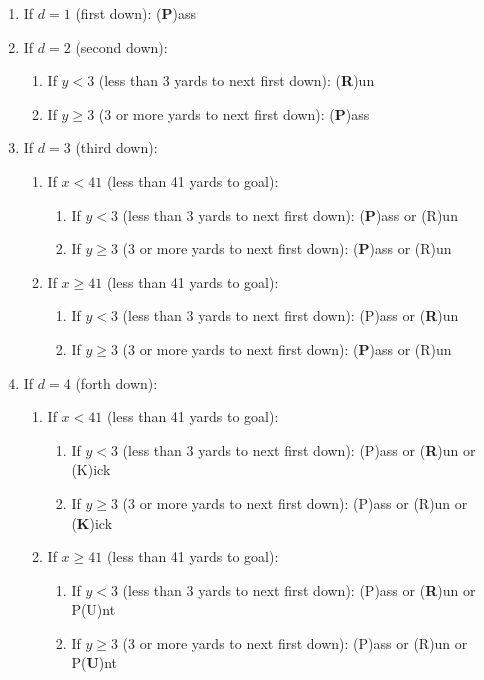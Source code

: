 \documentclass[11pt, oneside]{article}   	%
\begin{document}
\begin{enumerate}
\item If $d=1$ (first down): (\textbf{P})ass

\item If $d=2$ (second down): 
\begin{enumerate}
\item If $y<3$ (less than 3 yards to next first down): (\textbf{R})un
\item If $y\geq3$ (3 or more yards to next first down): (\textbf{P})ass
\end{enumerate}

\item If $d=3$ (third down): 
\begin{enumerate}
\item If $x<41$ (less than 41 yards to goal):
\begin{enumerate}
\item If $y<3$ (less than 3 yards to next first down): (\textbf{P})ass or (R)un
\item If $y\geq3$ (3 or more yards to next first down): (\textbf{P})ass or (R)un
\end{enumerate}
\item If $x \geq 41$ (less than 41 yards to goal):
\begin{enumerate}
\item If $y<3$ (less than 3 yards to next first down): (P)ass or (\textbf{R})un
\item If $y\geq3$ (3 or more yards to next first down): (\textbf{P})ass or (R)un
\end{enumerate}
\end{enumerate}

\item If $d=4$ (forth down): 
\begin{enumerate}
\item If $x<41$ (less than 41 yards to goal):
\begin{enumerate}
\item If $y<3$ (less than 3 yards to next first down): (P)ass or (\textbf{R})un or (K)ick
\item If $y\geq3$ (3 or more yards to next first down): (P)ass or (R)un or (\textbf{K})ick
\end{enumerate}
\item If $x \geq 41$ (less than 41 yards to goal):
\begin{enumerate}
\item If $y<3$ (less than 3 yards to next first down): (P)ass or (\textbf{R})un or P(U)nt
\item If $y\geq3$ (3 or more yards to next first down): (P)ass or (R)un or P(\textbf{U})nt
\end{enumerate}
\end{enumerate}

\end{enumerate}
\end{document}
